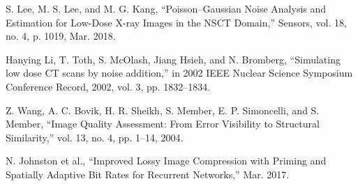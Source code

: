 \begin{thebibliography}{100}
 S. Lee, M. S. Lee, and M. G. Kang, “Poisson–Gaussian Noise Analysis and Estimation for Low-Dose X-ray Images in the NSCT Domain,” Sensors, vol. 18, no. 4, p. 1019, Mar. 2018.

 Hanying Li, T. Toth, S. McOlash, Jiang Hsieh, and N. Bromberg, “Simulating low dose CT scans by noise addition,” in 2002 IEEE Nuclear Science Symposium Conference Record, 2002, vol. 3, pp. 1832–1834.

 Z. Wang, A. C. Bovik, H. R. Sheikh, S. Member, E. P. Simoncelli, and S. Member, “Image Quality Assessment: From Error Visibility to Structural Similarity,” vol. 13, no. 4, pp. 1–14, 2004.

 N. Johnston et al., “Improved Lossy Image Compression with Priming and Spatially Adaptive Bit Rates for Recurrent Networks,” Mar. 2017.



\end{thebibliography}

